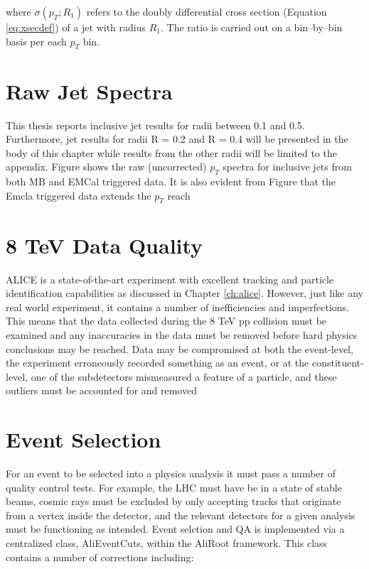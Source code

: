 \noindent
where $\sigma(p_{T};R_{1})$ refers to the doubly differential cross section (Equation \ref{eq:xsecdef}) of a jet with radius $R_{1}$.  The ratio is carried out on a bin--by--bin basis per each $p_{T}$ bin.  

\section{Raw Jet Spectra}

This thesis reports inclusive jet results for radii between 0.1 and 0.5.  Furthermore, jet results for radii R = 0.2 and R = 0.4 will be presented in the body of this chapter while results from the other radii will be limited to the appendix.  Figure shows the raw (uncorrected) $p_{T}$ spectra for inclusive jets from both MB and EMCal triggered data.  It is also evident from Figure that the Emcla triggered data extends the $p_{T}$ reach 



\section{8 TeV Data Quality}
ALICE is a state-of-the-art experiment with excellent tracking and particle identification capabilities as discussed in Chapter \ref{ch:alice}.  However, just like any real world experiment, it contains a number of inefficiencies and imperfections.  This means that the data collected during the 8 TeV pp collision must be examined and any inaccuracies in the data must be removed before hard physics conclusions may be reached.  Data may be compromised at both the event-level, the experiment erroneously recorded something as an event, or at the constituent-level, one of the subdetectors mismeasured a feature of a particle, and these outliers must be accounted for and removed 

\section{Event Selection}

For an event to be selected into a physics analysis it must pass a number of quality control tests.  For example, the LHC must have be in a state of stable beams, cosmic rays must be excluded by only accepting tracks that originate from a vertex inside the detector, and the relevant detectors for a given analysis must be functioning as intended.  Event selction and QA is implemented via a centralized class, AliEventCuts, within the AliRoot framework.  This class contains a number of corrections including:

